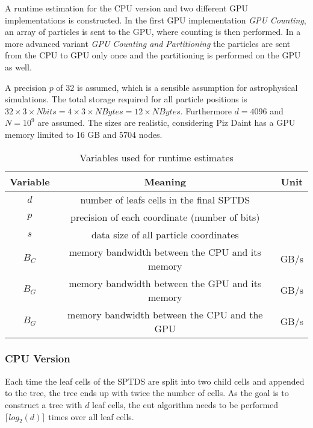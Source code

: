 \documentclass[]{article}
\begin{document}
A runtime estimation for the CPU version and two different GPU implementations is constructed. In the first GPU implementation \textit{GPU Counting}, an array of particles is sent to the GPU, where counting is then performed. In a more advanced variant \textit{GPU Counting and Partitioning} the particles are sent from the CPU to GPU only once and the partitioning is performed on the GPU as well.  

A precision $p$ of 32 is assumed, which is a sensible assumption for astrophysical simulations. The total storage required for all particle positions is $32 \times 3 \times N bits = 4 \times 3 \times N Bytes = 12 \times N Bytes$. Furthermore $d = 4096$ and $N=10^9$ are assumed. The sizes are realistic, considering Piz Daint has a GPU memory limited to 16 GB and 5704 nodes. 
 
 \small
 \begin{table}[H]
 	\begin{center}
 		\begin{tabular}{@{} c | c | c }
 			Variable & Meaning & Unit\\ 
 			\hline
 			$d$ & number of leafs cells in the final SPTDS \\
 			$p$ & precision of each coordinate (number of bits) \\
 			$s$ & data size of all particle coordinates \\
 			$B_C$ & memory bandwidth between the CPU and its memory & GB/s \\
 			$B_G$ & memory bandwidth between the GPU and its memory & GB/s \\
 			$B_G$ &	memory bandwidth between the CPU and the GPU & GB/s \\
 			
 			
 		\end{tabular}
 	\end{center}
 	\caption{Variables used for runtime estimates}
 	\label{tab:runtime}
 \end{table}

\subsubsection{CPU Version}

Each time the leaf cells of the SPTDS are split into two child cells and appended to the tree, the tree ends up with twice the number of cells. As the goal is to construct a tree with $d$ leaf cells, the cut algorithm needs to be performed $\lceil log_2(d) \rceil$ times over all leaf cells. 
\end{document}
